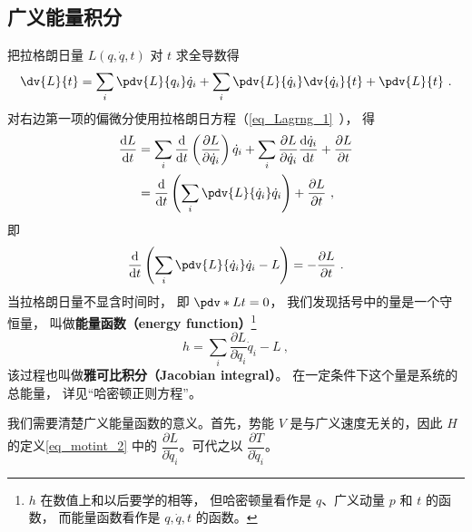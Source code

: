 \subsection{广义能量积分}

把拉格朗日量 $L(q, \dot{q}, t)$ 对 $t$ 求全导数得
\begin{equation}
\dv{L}{t} = \sum_{i} \pdv{L}{q_i} \dot{q}_i + \sum_{i} \pdv{L}{\dot{q}_i} \dv{\dot{q}_i}{t} + \pdv{L}{t}~.
\end{equation}
对右边第一项的偏微分使用拉格朗日方程（\autoref{eq_Lagrng_1}~）， 得
\begin{equation}
\begin{aligned}
\frac{\mathrm{d} L}{\mathrm{d} t} &=\sum_{i} \frac{\mathrm{d}}{\mathrm{d} t}\left(\frac{\partial L}{\partial \dot{q}_{i}}\right) \dot{q}_{i}+\sum_{i} \frac{\partial L}{\partial \dot{q}_{i}} \frac{\mathrm{d} \dot{q}_{i}}{\mathrm{d} t} + \frac{\partial L}{\partial t} \\
&= \frac{\mathrm{d}}{\mathrm{d} t}\left(\sum_{i} \pdv{L}{\dot q_i} \dot{q}_{i}\right) + \frac{\partial L}{\partial t}~,
\end{aligned}
\end{equation}
即
\begin{equation} \label{eq_motint_1}
\frac{\mathrm{d}}{\mathrm{d} t}\left(\sum_{i} \pdv{L}{\dot q_i} \dot{q}_{i}-L\right) = -\frac{\partial L}{\partial t}~.
\end{equation}
当拉格朗日量不显含时间时， 即 $\pdv*{L}{t} = 0$， 我们发现括号中的量是一个守恒量， 叫做\textbf{能量函数（energy function）}\footnote{$h$ 在数值上和以后要学的相等， 但哈密顿量看作是 $q$、广义动量 $p$ 和 $t$ 的函数， 而能量函数看作是 $q, \dot q, t$ 的函数。}
\begin{equation} \label{eq_motint_2}
h = \sum_{i} \frac{\partial L}{\partial \dot{q}_{i}} \dot{q}_{i}-L~,
\end{equation}
该过程也叫做\textbf{雅可比积分（Jacobian integral）}。 在一定条件下这个量是系统的总能量， 详见“哈密顿正则方程”。


我们需要清楚广义能量函数的意义。首先，势能 $V$ 是与广义速度无关的，因此 $H$ 的定义\autoref{eq_motint_2} 中的 $\dfrac{\partial L}{\partial \dot q_i}$。可代之以 $\dfrac{\partial T}{\partial \dot q_i}$。

